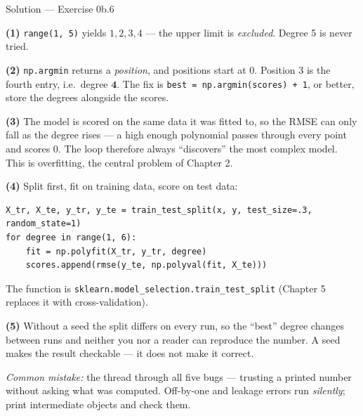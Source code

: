 \documentclass[aspectratio=169,11pt]{beamer}
\begin{document}
\begin{frame}[fragile]{Solution --- Exercise 0b.6}
  \begin{solutionbox}
    \scriptsize
    \textbf{(1)} \texttt{range(1, 5)} yields $1, 2, 3, 4$ --- the upper limit is
    \emph{excluded}. Degree 5 is never tried.

    \textbf{(2)} \texttt{np.argmin} returns a \emph{position}, and positions
    start at $0$. Position $3$ is the fourth entry, i.e.\ degree
    $\mathbf{4}$. The fix is \texttt{best = np.argmin(scores) + 1}, or better,
    store the degrees alongside the scores.

    \textbf{(3)} The model is scored on the same data it was fitted to, so the
    RMSE can only fall as the degree rises --- a high enough polynomial passes
    through every point and scores $0$. The loop therefore always ``discovers''
    the most complex model. This is overfitting, the central problem of
    Chapter 2.

    \textbf{(4)} Split first, fit on training data, score on test data:
\begin{lstlisting}
X_tr, X_te, y_tr, y_te = train_test_split(x, y, test_size=.3, random_state=1)
for degree in range(1, 6):
    fit = np.polyfit(X_tr, y_tr, degree)
    scores.append(rmse(y_te, np.polyval(fit, X_te)))
\end{lstlisting}
    The function is \texttt{sklearn.model\_selection.train\_test\_split}
    (Chapter 5 replaces it with cross-validation).

    \textbf{(5)} Without a seed the split differs on every run, so the ``best''
    degree changes between runs and neither you nor a reader can reproduce the
    number. A seed makes the result checkable --- it does not make it correct.

    \smallskip
    \textit{Common mistake:} the thread through all five bugs --- trusting a
    printed number without asking what was computed. Off-by-one and leakage
    errors run \emph{silently}; print intermediate objects and check them.
  \end{solutionbox}
\end{frame}
\end{document}
